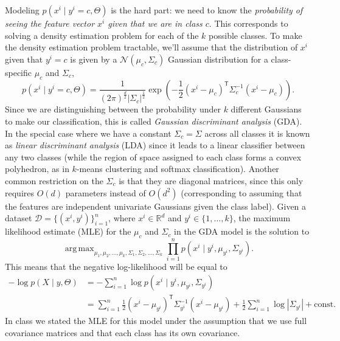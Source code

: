 \documentclass{article}
\DeclareMathOperator*{\argmax}{arg\,max}
\newcommand\R{\mathbb{R}}
\newcommand{\tp}{^\mathsf{T}}
\begin{document}
Modeling $p(x^i \mid y^i =c, \Theta)$ is the hard part: we need to know the \emph{probability of seeing the feature vector $x^i$ given that we are in class $c$}. This corresponds to solving a density estimation problem for each of the $k$ possible classes. 
To make the density estimation problem tractable, we'll assume that the distribution of $x^i$ given that $y^i=c$ is given by a $\mathcal{N}(\mu_c,\Sigma_c)$ Gaussian distribution for a class-specific $\mu_c$ and $\Sigma_c$,
\[
p(x^i \mid y^i=c, \Theta) = \frac{1}{(2\pi)^{\frac{d}{2}}|\Sigma_c|^{\frac12}}\exp\left(-\frac12 (x^i-\mu_c)\tp \Sigma_c^{-1}(x^i-\mu_c)\right).
\]
Since we are distinguishing between the probability under $k$ different Gaussians to make our classification, this is called \emph{Gaussian discriminant analysis} (GDA).
In the special case where we have a constant $\Sigma_c = \Sigma$ across all classes it is known as \emph{linear discriminant analysis} (LDA) since it leads to a linear classifier between any two classes (while the region of space assigned to each class forms a convex polyhedron, as in $k$-means clustering and softmax classification).
Another common restriction on the $\Sigma_c$ is that they are diagonal matrices, since this only requires $O(d)$ parameters instead of $O(d^2)$ (corresponding to assuming that the features are independent univariate Gaussians given the class label).
Given a dataset $\mathcal{D}=\{(x^i, y^i)\}_{i=1}^n$, where $x^i\in\R^d$ and $y^i\in\{1,\ldots,k\}$, the maximum likelihood estimate (MLE) for the $\mu_c$ and $\Sigma_c$ in the GDA model is the solution to
\[
\argmax_{\mu_1,\mu_2,\dots,\mu_k,\Sigma_1,\Sigma_2,\dots,\Sigma_k} \prod_{i=1}^n p(x^i \mid y^i, \mu_{y^i},\Sigma_{y^i}).
\]
This means that the negative log-likelihood will be  equal to
\begin{align*}
    - \log p(X\mid y,\Theta) & = -\sum_{i=1}^n \log p(x^i \mid y^i, \mu_{y^i},\Sigma_{y^i})\\
    & = \sum_{i=1}^n \frac{1}{2}(x^i - \mu_{y^i})\tp \Sigma_{y^i}^{-1}(x^i - \mu_{y^i}) + \frac12\sum_{i=1}^n \log|\Sigma_{y^i}| + \text{const.}
\end{align*}
In class we stated the MLE for this model under the assumption that we use full covariance matrices and that each class has its own covariance.
\end{document}
